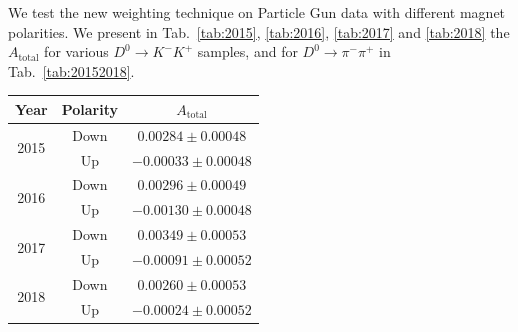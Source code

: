 \documentclass{article}
\begin{document}


        We test the new weighting technique on Particle Gun data with different magnet polarities.
        We present in Tab.~\ref{tab:2015}, \ref{tab:2016}, \ref{tab:2017} and \ref{tab:2018} the $A_\text{total}$ for various $D^0\to K^-K^+$ samples, and for $D^0\to \pi^-\pi^+$ in Tab.~\ref{tab:20152018}.
        \begin{center}
                \begin{tabular}{c|c|c}
                        Year & Polarity & $A_\text{total}$\\
                        \hline\hline
                        \multirow{2}{*}{2015} & Down & $0.00284 \pm 0.00048$\\
                        \cline{2-3}
                        & Up & $-0.00033\pm 0.00048$\\
                        \hline
                        \multirow{2}{*}{2016} & Down & $0.00296\pm 0.00049$\\
                        \cline{2-3}
                        & Up & $-0.00130\pm 0.00048$\\
                        \hline
                        \multirow{2}{*}{2017} & Down & $0.00349\pm 0.00053$\\
                        \cline{2-3}
                        & Up & $-0.00091\pm 0.00052$\\
                        \hline
                        \multirow{2}{*}{2018} & Down & $0.00260\pm 0.00053$\\
                        \cline{2-3}
                        & Up & $-0.00024\pm 0.00052$\\
                \end{tabular}
                \label{tab:20152018}
        \end{center}
\end{document}
